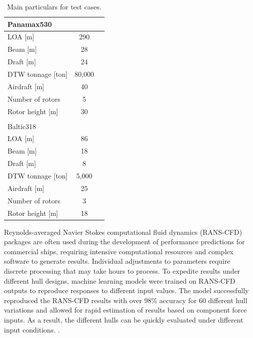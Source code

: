 \documentclass[twoside,twocolumn]{article}
\begin{document}
\begin{table}[!th]
	\caption{Main particulars for test cases.}    
	\begin{tabular}{lSS}
		\toprule
		Panamax530		                   &              \\ \midrule
		LOA [m]                             & 290          \\
		Beam [m]                            & 28           \\
		Draft [m]                           & 24          \\
		DTW tonnage [ton]                   & 80,000      \\
		Airdraft [m]						& 40	\\
		Number of rotors                    & 5        \\
		Rotor height [m]                    & 30         \\

		& \\
		Baltic318		                &              \\ \midrule
		LOA [m]                             & 86          \\
		Beam [m]                            & 18           \\
		Draft [m]                           & 8          \\
		DTW tonnage [ton]                   & 5,000      \\
		Airdraft [m]						&  25	\\
		Number of rotors                    & 3       \\
		Rotor height [m]                    & 18        
		\\ \bottomrule
	\end{tabular}
	\label{tab:mainparticularsA}
\end{table}

Reynolds-averaged Navier Stokes computational fluid dynamics (RANS-CFD) packages are often used during the development of performance predictions for commercial ships, requiring intensive computational resources and complex software to generate results. Individual adjustments to parameters require discrete processing that may take hours to process. To expedite results under different hull designs, machine learning models were trained on RANS-CFD outputs to reproduce responses to different input values. The model successfully reproduced the RANS-CFD results with over 98\% accuracy for 60 different hull variations and allowed for rapid estimation of results based on component force inputs. As a result, the different hulls can be quickly evaluated under different input conditions. \citep{Freeman2018}.
\end{document}
